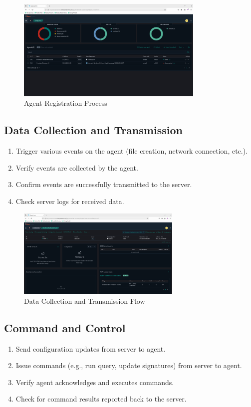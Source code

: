\begin{figure}[h]
    \centering
    \includegraphics[width=0.8\textwidth]{openarmor-agent/4.png}
    \caption{Agent Registration Process}
    \label{fig:agent-registration}
\end{figure}

\subsection{Data Collection and Transmission}
\begin{enumerate}
    \item Trigger various events on the agent (file creation, network connection, etc.).
    \item Verify events are collected by the agent.
    \item Confirm events are successfully transmitted to the server.
    \item Check server logs for received data.
\end{enumerate}

\begin{figure}[h]
    \centering
    \includegraphics[width=0.7\textwidth]{openarmor-agent/5.png}
    \caption{Data Collection and Transmission Flow}
    \label{fig:data-collection}
\end{figure}

\subsection{Command and Control}
\begin{enumerate}
    \item Send configuration updates from server to agent.
    \item Issue commands (e.g., run query, update signatures) from server to agent.
    \item Verify agent acknowledges and executes commands.
    \item Check for command results reported back to the server.
\end{enumerate}

